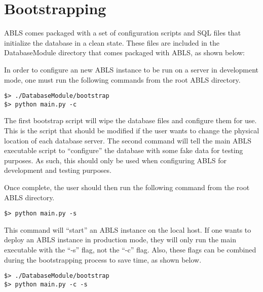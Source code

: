 \chapter{Bootstrapping}

ABLS comes packaged with a set of configuration scripts and SQL files that initialize
the database in a clean state. These files are included in the DatabaseModule directory
that comes packaged with ABLS, as shown below:


In order to configure an new ABLS instance to be run on a server in development mode, one must run
the following commands from the root ABLS directory.

\begin{lstlisting}
$> ./DatabaseModule/bootstrap 
$> python main.py -c 
\end{lstlisting}

The first bootstrap script will wipe the database files and configure them for use.
This is the script that should be modified if the user wants to change the physical
location of each database server. The second command will tell the main ABLS executable
script to ``configure'' the database with some fake data for testing purposes. As such,
this should only be used when configuring ABLS for development and testing purposes.

Once complete, the user should then run the following command from the root ABLS directory.

\begin{lstlisting}
$> python main.py -s
\end{lstlisting}

This command will ``start'' an ABLS instance on the local host. If one wants to deploy 
an ABLS instance in production mode, they will only run the main executable with the 
``-s'' flag, not the ``-c'' flag. Also, these flags can be combined during the bootstrapping
process to save time, as shown below.

\begin{lstlisting}
$> ./DatabaseModule/bootstrap 
$> python main.py -c -s
\end{lstlisting}